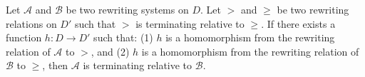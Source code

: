 \begin{definition}
    \label{def:rewriting_system:proving_relative_termination}
    Let \( \mathcal{A} \) and \( \mathcal{B} \) be two rewriting systems on $D$. Let $>$ and $\geq$ be two rewriting relations on $D'$ such that $>$ is terminating relative to $\geq$. If there exists a function $h : D \mathop{\to} D'$ such that: (1) $h$ is a homomorphism from the rewriting relation of \(\mathcal{A}\) to $>$, and (2) $h$ is a homomorphism from the rewriting relation of \(\mathcal{B}\) to $\geq$, then \(\mathcal{A}\) is terminating relative to \(\mathcal{B}\).
\end{definition}



